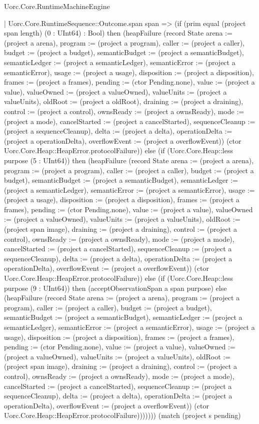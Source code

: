 \begin{lexlean}{Uorc.Core.RuntimeMachineEngine}
\begin{semanticmodule}
{    | Uorc.Core.RuntimeSequence::Outcome.span span => (if (prim equal (project span length) (0 : UInt64) : Bool) then (heapFailure (record State {arena := (project a arena), program := (project a program), caller := (project a caller), budget := (project a budget), semanticBudget := (project a semanticBudget), semanticLedger := (project a semanticLedger), semanticError := (project a semanticError), usage := (project a usage), disposition := (project a disposition), frames := (project a frames), pending := (ctor Pending.none), value := (project a value), valueOwned := (project a valueOwned), valueUnits := (project a valueUnits), oldRoot := (project a oldRoot), draining := (project a draining), control := (project a control), ownsReady := (project a ownsReady), mode := (project a mode), cancelStarted := (project a cancelStarted), sequenceCleanup := (project a sequenceCleanup), delta := (project a delta), operationDelta := (project a operationDelta), overflowEvent := (project a overflowEvent)}) (ctor Uorc.Core.Heap::HeapError.protocolFailure)) else (if (Uorc.Core.Heap::less purpose (5 : UInt64)) then (heapFailure (record State {arena := (project a arena), program := (project a program), caller := (project a caller), budget := (project a budget), semanticBudget := (project a semanticBudget), semanticLedger := (project a semanticLedger), semanticError := (project a semanticError), usage := (project a usage), disposition := (project a disposition), frames := (project a frames), pending := (ctor Pending.none), value := (project a value), valueOwned := (project a valueOwned), valueUnits := (project a valueUnits), oldRoot := (project span image), draining := (project a draining), control := (project a control), ownsReady := (project a ownsReady), mode := (project a mode), cancelStarted := (project a cancelStarted), sequenceCleanup := (project a sequenceCleanup), delta := (project a delta), operationDelta := (project a operationDelta), overflowEvent := (project a overflowEvent)}) (ctor Uorc.Core.Heap::HeapError.protocolFailure)) else (if (Uorc.Core.Heap::less purpose (9 : UInt64)) then (acceptObservationSpan a span purpose) else (heapFailure (record State {arena := (project a arena), program := (project a program), caller := (project a caller), budget := (project a budget), semanticBudget := (project a semanticBudget), semanticLedger := (project a semanticLedger), semanticError := (project a semanticError), usage := (project a usage), disposition := (project a disposition), frames := (project a frames), pending := (ctor Pending.none), value := (project a value), valueOwned := (project a valueOwned), valueUnits := (project a valueUnits), oldRoot := (project span image), draining := (project a draining), control := (project a control), ownsReady := (project a ownsReady), mode := (project a mode), cancelStarted := (project a cancelStarted), sequenceCleanup := (project a sequenceCleanup), delta := (project a delta), operationDelta := (project a operationDelta), overflowEvent := (project a overflowEvent)}) (ctor Uorc.Core.Heap::HeapError.protocolFailure))))))) (match (project s pending)
}
\end{semanticmodule}
\end{lexlean}
